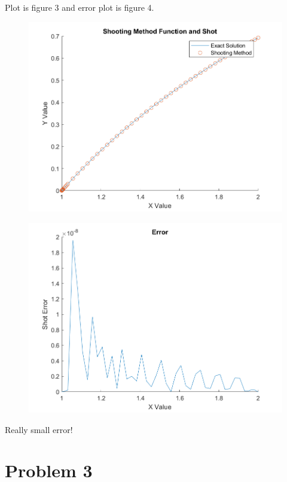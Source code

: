 \documentclass[]{article}
\begin{document}
Plot is figure 3 and error plot is figure 4.

\begin{figure}
\centering
\includegraphics{./ShootingPlot2.png}
\caption{}
\end{figure}

\begin{figure}
\centering
\includegraphics{./ShootingErr2.png}
\caption{}
\end{figure}

Really small error!

\section{Problem 3}\label{problem-3}
\end{document}

